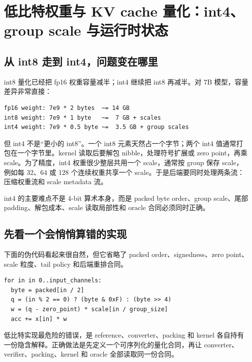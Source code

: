 \section{低比特权重与 KV cache 量化：int4、group scale 与运行时状态}

\subsection{从 int8 走到 int4，问题变在哪里}

int8 量化已经把 fp16 权重容量减半；int4 继续把 int8 再减半。对 7B 模型，容量差异非常直接：

\begin{lstlisting}[numbers=none,caption={7B 权重容量和元数据压力}]
fp16 weight: 7e9 * 2 bytes  ~= 14 GB
int8 weight: 7e9 * 1 byte   ~=  7 GB + scales
int4 weight: 7e9 * 0.5 byte ~=  3.5 GB + group scales
\end{lstlisting}

但 int4 不是“更小的 int8”。一个 int8 元素天然占一个字节；两个 int4 值通常打包在一个字节里。kernel 读取后要解包 nibble，处理符号扩展或 zero point，再乘 scale。为了精度，int4 权重很少整层共用一个 scale，通常按 group 保存 scale，例如每 32、64 或 128 个连续权重共享一个 scale。于是后端要同时处理两条流：压缩权重流和 scale metadata 流。

\begin{keyidea}
int4 的主要难点不是 4-bit 算术本身，而是 packed byte order、group scale、尾部 padding、解包成本、scale 读取局部性和 oracle 合同必须同时正确。
\end{keyidea}

\subsection{先看一个会悄悄算错的实现}

下面的伪代码看起来很自然，但它省略了 packed order、signedness、zero point、scale 粒度、tail policy 和后端重排合同。

\begin{lstlisting}[numbers=none,caption={容易算错的 int4 解包形态}]
for in in 0..input_channels:
  byte = packed[in / 2]
  q = (in % 2 == 0) ? (byte & 0xF) : (byte >> 4)
  w = (q - zero_point) * scale[in / group_size]
  acc += x[in] * w
\end{lstlisting}

\begin{warningbox}
低比特实现最危险的错误，是 reference、converter、packing 和 kernel 各自持有一份隐含解释。正确做法是先定义一个可序列化的量化合同，再让 converter、verifier、packing、kernel 和 oracle 全部读取同一份合同。
\end{warningbox}

